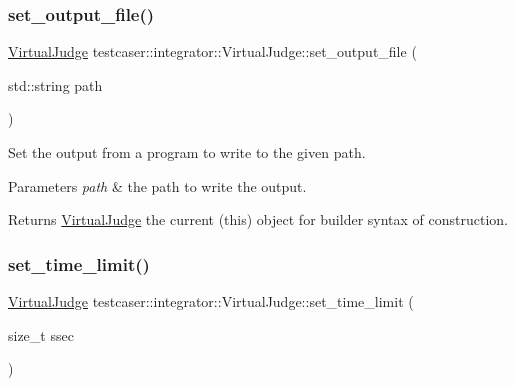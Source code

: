\subsubsection{\texorpdfstring{set\+\_\+output\+\_\+file()}{set\_output\_file()}}
{\footnotesize\ttfamily \hyperlink{classtestcaser_1_1integrator_1_1VirtualJudge}{Virtual\+Judge} testcaser\+::integrator\+::\+Virtual\+Judge\+::set\+\_\+output\+\_\+file (\begin{DoxyParamCaption}\item[{std\+::string}]{path }\end{DoxyParamCaption})\hspace{0.3cm}{\ttfamily [inline]}}



Set the output from a program to write to the given path. 


\begin{DoxyParams}{Parameters}
{\em path} & the path to write the output. \\
\hline
\end{DoxyParams}
\begin{DoxyReturn}{Returns}
\hyperlink{classtestcaser_1_1integrator_1_1VirtualJudge}{Virtual\+Judge} the current (this) object for builder syntax of construction. 
\end{DoxyReturn}
\mbox{\label{classtestcaser_1_1integrator_1_1VirtualJudge_a121272932bb115881ad90be79ad7d0a7}} 
\subsubsection{\texorpdfstring{set\+\_\+time\+\_\+limit()}{set\_time\_limit()}}
{\footnotesize\ttfamily \hyperlink{classtestcaser_1_1integrator_1_1VirtualJudge}{Virtual\+Judge} testcaser\+::integrator\+::\+Virtual\+Judge\+::set\+\_\+time\+\_\+limit (\begin{DoxyParamCaption}\item[{size\+\_\+t}]{ssec }\end{DoxyParamCaption})\hspace{0.3cm}{\ttfamily [inline]}}



